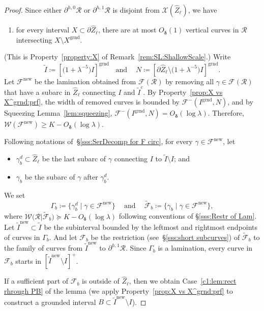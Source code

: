 \documentclass{amsart}
\renewcommand{\sp}{{\ \ }}
\newcommand{\1}{{\mathbb 1 }}
\newcommand{\Fam}{{\mathcal F}}
\newcommand{\Width}{{\mathcal W}}
\newcommand\RR{\mathcal{R}}
\newcommand\XX{\mathcal{X}}
\newcommand{\wZ}{{\widehat Z}}
\newcommand{\grnd}{{\operatorname{grnd}}}
\newcommand\new{{\operatorname{new}}}
\theoremstyle{remark}
\numberwithin{equation}{section}
\theoremstyle{definition}
\newcommand{\bdelta}{{\boldsymbol{ \delta}}}
\begin{document}
\begin{proof}
Since either $\partial^{h,0}\RR$ or $\partial^{h,1} \RR$ is disjoint from $\XX(\wZ_\ell)$, we have
\begin{enumerate}[label=\text{(\Alph*)},start=24,font=\normalfont,leftmargin=*]
\item \label{prop:X vs X^grnd:prf}for every interval $X\subset \partial \wZ_\ell$, there are at most $O_\bdelta(1)$ vertical curves in $\RR$ intersecting $X\setminus X^\grnd$.
\end{enumerate}
(This is Property~\ref{property:X} of Remark~\ref{rem:SL:ShallowScale}.) Write \[\widetilde I \coloneqq \left[\big(1+ \lambda^{-5}\big)I\right]^\grnd\sp\sp \text{and }\sp\sp N\coloneqq \left[\partial \wZ_\ell\setminus \big(1+ \lambda^{-5}\big)I\right]^\grnd.\] Let $\Fam^\new$ be the lamination obtained from $\Fam(\RR)$ by removing all $\gamma\in \Fam(\RR)$ that have a subarc in $\wZ_\ell$ connecting $I$ and $\widetilde I^c$. By Property~\ref{prop:X vs X^grnd:prf}, the width of removed curves is bounded by $\Fam^-(I^\grnd, N)$, and by Squeezing Lemma~\ref{lem:squeezing}, $\Fam^-(I^\grnd, N)=O_\bdelta(\log \lambda).$ Therefore, $\Width(\Fam^\new)\ge K-O_\bdelta(\log \lambda)$.

Following notations of~\S\ref{sss:SerDecomp for F circ}, for every $\gamma\in \Fam^\new$, let  
\begin{itemize}
\item $\gamma_b^d\subset \wZ_\ell$ be the last subarc  of $\gamma$ connecting $I$ to $\widetilde I\setminus I$; and
\item $\gamma_b$ be the subarc of $\gamma$ after $\gamma^d_b$.
\end{itemize}


We set \[\Gamma_b\coloneqq\{\gamma_b^d\mid \gamma\in \Fam^\new\}\sp\sp\text{ and }\sp\sp \widetilde \Fam_b\coloneqq \{\gamma_b\mid \gamma\in \Fam^\new\},\]
where $\Width\big(\RR|\widetilde \Fam_b\big)\succeq K-O_\bdelta(\log \lambda)$ following conventions of \S\ref{sss:Restr of Lam}. Let $\widetilde I^\new\subset \widetilde I$ be the subinterval bounded by the leftmost and rightmost endpoints of curves in $\Gamma_b$. And let $\Fam_b$ be the restriction (see~\S\ref{sss:short subcurves}) of $\widetilde \Fam_b$ to the family of curves from $\widetilde I^\new$ to $\partial^{h,1} \RR$. Since $\Gamma_b$ is a lamination, every curve in $\Fam_b$ starts in $\left[\widetilde I^\new\setminus I \right]^+$.

If a sufficient part of $\Fam_b$ is outside of $\wZ_\ell$, then we obtain Case~\ref{c1:lem:rect rhrough PB} of the lemma (we apply Property~\ref{prop:X vs X^grnd:prf}  to construct  a grounded interval $B\subset \widetilde I^\new\setminus I$). 


\end{proof}
\end{document}
